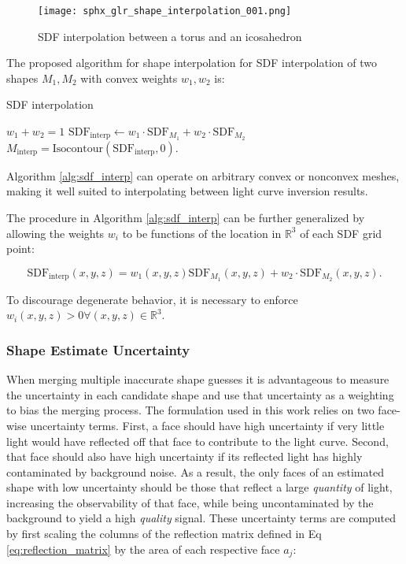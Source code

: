 \begin{figure}[!htb]
  \centering
  \texttt{[image: sphx\_glr\_shape\_interpolation\_001.png]}
  \caption{SDF interpolation between a torus and an icosahedron}
  \label{fig:interpolating_torus_ico}
\end{figure}

The proposed algorithm for shape interpolation for SDF interpolation of two shapes $M_1, M_2$ with convex weights $w_1, w_2$ is:

\begin{algorithm}
  \caption{SDF interpolation}\label{alg:sdf_interp}
  \begin{algorithmic}
  \Require $w_1 + w_2 = 1$
  \State $\mathrm{SDF}_{\textrm{interp}} \gets w_1 \cdot \mathrm{SDF}_{M_1} + w_2 \cdot \mathrm{SDF}_{M_2}$
  \State $M_{\textrm{interp}} = \mathrm{Isocontour}(\mathrm{SDF}_{\textrm{interp}}, 0)$.
  \end{algorithmic}
\end{algorithm}

Algorithm \ref{alg:sdf_interp} can operate on arbitrary convex or nonconvex meshes, making it well suited to interpolating between light curve inversion results.

The procedure in Algorithm \ref{alg:sdf_interp} can be further generalized by allowing the weights $w_i$ to be functions of the location in $\mathbb{R}^3$ of each SDF grid point:

\begin{equation}
  \mathrm{SDF}_{\textrm{interp}}(x, y, z) = w_1(x, y, z) \mathrm{SDF}_{M_1}(x, y, z) + w_2 \cdot \mathrm{SDF}_{M_2}(x, y, z).
\end{equation}

To discourage degenerate behavior, it is necessary to enforce $w_i(x,y,z) > 0 \forall (x,y,z) \in \mathbb{R}^3$.

\subsubsection{Shape Estimate Uncertainty}

When merging multiple inaccurate shape guesses it is advantageous to measure the uncertainty in each candidate shape and use that uncertainty as a weighting to bias the merging process. The formulation used in this work relies on two face-wise uncertainty terms. First, a face should have high uncertainty if very little light would have reflected off that face to contribute to the light curve. Second, that face should also have high uncertainty if its reflected light has highly contaminated by background noise. As a result, the only faces of an estimated shape with low uncertainty should be those that reflect a large \textit{quantity} of light, increasing the observability of that face, while being uncontaminated by the background to yield a high \textit{quality} signal. These uncertainty terms are computed by first scaling the columns of the reflection matrix defined in Eq \ref{eq:reflection_matrix} by the area of each respective face $a_j$:

